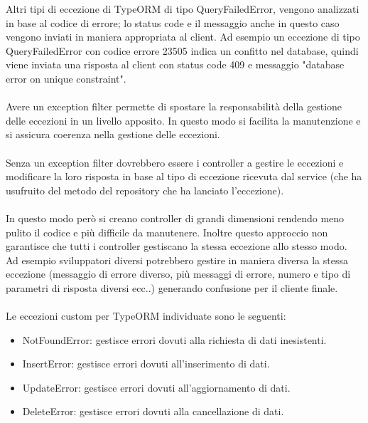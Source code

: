 Altri tipi di eccezione di TypeORM di tipo QueryFailedError, vengono analizzati in base al codice di errore; 
lo status code e il messaggio anche in questo caso vengono inviati in maniera appropriata al client.
Ad esempio un eccezione di tipo QueryFailedError con codice errore 23505 indica un confitto nel database, quindi
viene inviata una risposta al client con status code 409 e messaggio "database error on unique constraint".
\\\\
Avere un exception filter permette di spostare la responsabilità della gestione delle eccezioni in un livello
apposito. In questo modo si facilita la manutenzione e si assicura coerenza nella gestione delle eccezioni.
\\\\
Senza un exception filter dovrebbero essere i controller a gestire le eccezioni e modificare la loro risposta
in base al tipo di eccezione ricevuta dal service (che ha usufruito del metodo del repository che ha lanciato
l'eccezione).
\\\\
In questo modo però si creano controller di grandi dimensioni rendendo meno pulito il codice e più difficile
da manutenere. Inoltre questo approccio non garantisce che tutti i controller gestiscano la stessa eccezione
allo stesso modo. 
\\
Ad esempio sviluppatori diversi potrebbero gestire in maniera diversa la stessa eccezione (messaggio di errore diverso,
più messaggi di errore, numero e tipo di parametri di risposta diversi ecc..)
generando confusione per il cliente finale.
\\\\
Le eccezioni custom per TypeORM individuate sono le seguenti:
\begin{itemize}
    \item NotFoundError: gestisce errori dovuti alla richiesta di dati inesistenti.
    \item InsertError: gestisce errori dovuti all'inserimento di dati.
    \item UpdateError: gestisce errori dovuti all'aggiornamento di dati.
    \item DeleteError: gestisce errori dovuti alla cancellazione di dati.
\end{itemize}
\leavevmode\newline